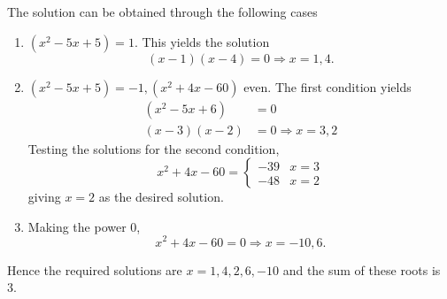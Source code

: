 The solution can be obtained through the following cases
\begin{enumerate}
\item $\left( x^{2}-5x+5 \right) = 1$. This yields the solution 
\begin{equation}
\left( x-1 \right)\left( x-4 \right) = 0 \Rightarrow x = 1,4.
\end{equation}
\item $\left( x^{2}-5x+5 \right) = -1, \left( x^{2}+4x-60 \right)$ even. The first condition yields
%
\begin{align}
\left( x^{2}-5x+6 \right) &= 0
\\
\left( x-3 \right)\left( x-2 \right) &= 0 \Rightarrow x = 3 , 2
\end{align}
Testing the solutions for the second condition,
\begin{equation}
x^2+4x-60
= 
\begin{cases}
-39 & x = 3
\\
-48 & x = 2
\end{cases}
\end{equation}
giving $x =2$ as the desired solution.
%
\item Making the power 0,
\begin{equation}
x^{2}+4x-60 = 0 \Rightarrow x = -10 , 6.
\end{equation}
\end{enumerate}
%
Hence the required solutions are $x=1,4,2,6,-10$ and the sum of these roots is 3.
 
